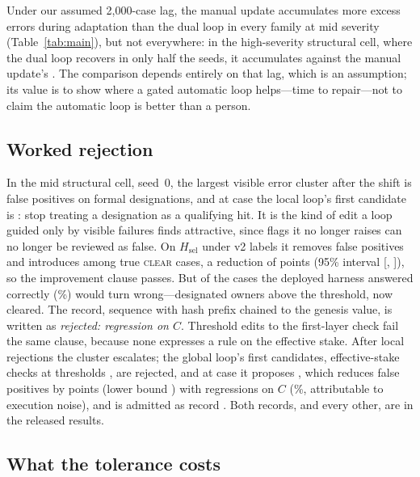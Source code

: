 \documentclass[11pt]{article}
\newcommand{\Hsel}{H_{\mathrm{sel}}}
\begin{document}
Under our assumed 2{,}000-case lag, the manual update accumulates more excess errors during adaptation than the dual loop in every family at mid severity (Table~\ref{tab:main}), but not everywhere: in the high-severity structural cell, where the dual loop recovers in only half the seeds, it accumulates \excstructhighdual{} against the manual update's \excstructhighmanual. The comparison depends entirely on that lag, which is an assumption; its value is to show where a gated automatic loop helps---time to repair---not to claim the automatic loop is better than a person.

\subsection{Worked rejection}

In the mid structural cell, seed~0, the largest visible error cluster after the shift is false positives on formal designations, and at case \wrT{} the local loop's first candidate is \emph{\wrDiff}: stop treating a designation as a qualifying hit. It is the kind of edit a loop guided only by visible failures finds attractive, since flags it no longer raises can no longer be reviewed as false. On $\Hsel$ under v2 labels it removes \wrImproved{} false positives and introduces \wrWorsened{} among \wrNtarget{} true \textsc{clear} cases, a reduction of \wrGain{} points (95\% interval [\wrGainLo, \wrGainHi]), so the improvement clause passes. But \wrCreg{} of the \wrC{} cases the deployed harness answered correctly (\wrCrate\%) would turn wrong---designated owners above the threshold, now cleared. The record, sequence \wrSeq{} with hash prefix \texttt{\wrHash} chained to the genesis value, is written as \emph{rejected: regression on $C$}. Threshold edits to the first-layer check fail the same clause, because none expresses a rule on the effective stake. After \wrLocalRej{} local rejections the cluster escalates; the global loop's first \wrGlobalRej{} candidates, effective-stake checks at thresholds \wrGlobalRejList, are rejected, and at case \waT{} it proposes \emph{\waDiff}, which reduces false positives by \waGain{} points (lower bound \waGainLo) with \waCreg{} regressions on $C$ (\waCrate\%, attributable to execution noise), and is admitted as record \waSeq. Both records, and every other, are in the released results.

\subsection{What the tolerance costs}
\label{sec:eps}
\end{document}
